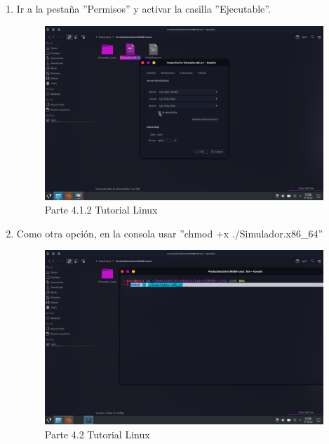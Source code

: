 \begin{enumerate}[label=\arabic*.-]
    \item Ir a la pestaña ''Permisos'' y activar la casilla ''Ejecutable''.
\begin{figure}[ht]
    \centering
    \includegraphics[width=10.5cm]{figures/TutorialLinux/tutoriallinux (8).png}
    \caption{Parte 4.1.2 Tutorial Linux}
    \label{fig:tutolinux8}
\end{figure}
\clearpage

    \item Como otra opción, en la consola usar ''chmod +x ./Simulador.x86\_64''
\begin{figure}[ht]
    \centering
    \includegraphics[width=10.5cm]{figures/TutorialLinux/tutoriallinux (9).png}
    \caption{Parte 4.2 Tutorial Linux}
    \label{fig:tutolinux9}
\end{figure}
\end{enumerate}

